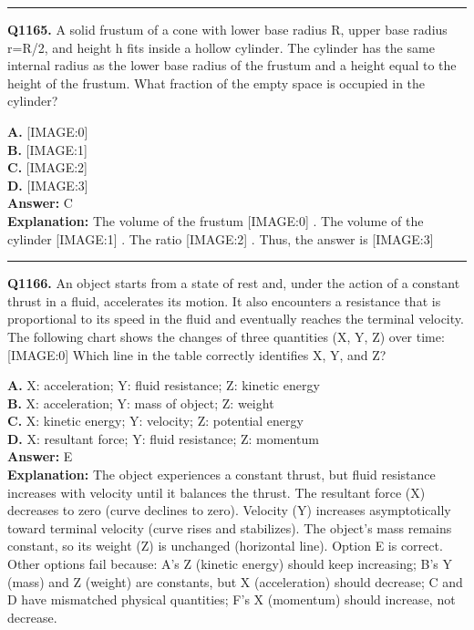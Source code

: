 \documentclass[12pt]{article}
\begin{document}
\hrule
\vspace{1em}


\noindent
\textbf{Q1165.} A solid frustum of a cone with lower base radius R, upper base radius r=R/2, and height h fits inside a hollow cylinder. The cylinder has the same internal radius as the lower base radius of the frustum and a height equal to the height of the frustum. What fraction of the empty space is occupied in the cylinder?



\textbf{A.} [IMAGE:0] \\
\textbf{B.} [IMAGE:1] \\
\textbf{C.} [IMAGE:2] \\
\textbf{D.} [IMAGE:3] \\

\textbf{Answer:} C \\
\textbf{Explanation:} The volume of the frustum
[IMAGE:0]
. The volume of the cylinder
[IMAGE:1]
. The ratio
[IMAGE:2]
.
Thus, the answer is
[IMAGE:3]

\hrule
\vspace{1em}


\noindent
\textbf{Q1166.} An object starts from a state of rest and, under the action of a constant thrust in a fluid, accelerates its motion. It also encounters a resistance that is proportional to its speed in the fluid and eventually reaches the terminal velocity. The following chart shows the changes of three quantities (X, Y, Z) over time:
[IMAGE:0]
Which line in the table correctly identifies X, Y, and Z?



\textbf{A.} X: acceleration; Y: fluid resistance; Z: kinetic energy \\
\textbf{B.} X: acceleration; Y: mass of object; Z: weight \\
\textbf{C.} X: kinetic energy; Y: velocity; Z: potential energy \\
\textbf{D.} X: resultant force; Y: fluid resistance; Z: momentum \\

\textbf{Answer:} E \\
\textbf{Explanation:} The object experiences a constant thrust, but fluid resistance increases with velocity until it balances the thrust. The resultant force (X) decreases to zero (curve declines to zero). Velocity (Y) increases asymptotically toward terminal velocity (curve rises and stabilizes). The object’s mass remains constant, so its weight (Z) is unchanged (horizontal line). Option E is correct. Other options fail because: A’s Z (kinetic energy) should keep increasing; B’s Y (mass) and Z (weight) are constants, but X (acceleration) should decrease; C and D have mismatched physical quantities; F’s X (momentum) should increase, not decrease.
\end{document}

